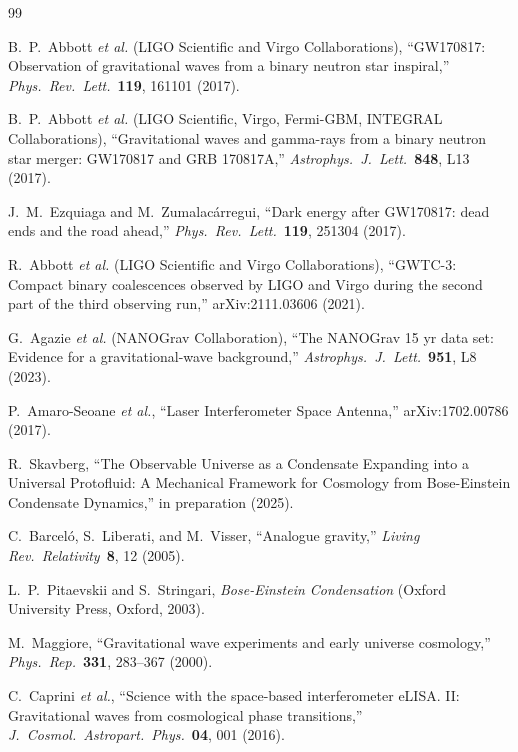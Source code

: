 \documentclass[11pt,a4paper]{article}
\theoremstyle{definition}
\theoremstyle{remark}
\begin{document}
\begin{thebibliography}{99}

B.~P.~Abbott \emph{et al.} (LIGO Scientific and Virgo Collaborations),
``GW170817: Observation of gravitational waves from a binary neutron star inspiral,''
\emph{Phys.\ Rev.\ Lett.}\ \textbf{119}, 161101 (2017).

B.~P.~Abbott \emph{et al.} (LIGO Scientific, Virgo, Fermi-GBM, INTEGRAL Collaborations),
``Gravitational waves and gamma-rays from a binary neutron star merger: GW170817 and GRB 170817A,''
\emph{Astrophys.\ J.\ Lett.}\ \textbf{848}, L13 (2017).

J.~M.~Ezquiaga and M.~Zumalac\'{a}rregui,
``Dark energy after GW170817: dead ends and the road ahead,''
\emph{Phys.\ Rev.\ Lett.}\ \textbf{119}, 251304 (2017).

R.~Abbott \emph{et al.} (LIGO Scientific and Virgo Collaborations),
``GWTC-3: Compact binary coalescences observed by LIGO and Virgo during the second part of the third observing run,''
arXiv:2111.03606 (2021).

G.~Agazie \emph{et al.} (NANOGrav Collaboration),
``The NANOGrav 15 yr data set: Evidence for a gravitational-wave background,''
\emph{Astrophys.\ J.\ Lett.}\ \textbf{951}, L8 (2023).

P.~Amaro-Seoane \emph{et al.},
``Laser Interferometer Space Antenna,''
arXiv:1702.00786 (2017).

R.~Skavberg,
``The Observable Universe as a Condensate Expanding into a Universal Protofluid: A Mechanical Framework for Cosmology from Bose-Einstein Condensate Dynamics,''
in preparation (2025).

C.~Barcel\'{o}, S.~Liberati, and M.~Visser,
``Analogue gravity,''
\emph{Living Rev.\ Relativity}\ \textbf{8}, 12 (2005).

L.~P.~Pitaevskii and S.~Stringari,
\emph{Bose-Einstein Condensation} (Oxford University Press, Oxford, 2003).

M.~Maggiore,
``Gravitational wave experiments and early universe cosmology,''
\emph{Phys.\ Rep.}\ \textbf{331}, 283--367 (2000).

C.~Caprini \emph{et al.},
``Science with the space-based interferometer eLISA. II: Gravitational waves from cosmological phase transitions,''
\emph{J.\ Cosmol.\ Astropart.\ Phys.}\ \textbf{04}, 001 (2016).


\end{thebibliography}
\end{document}
